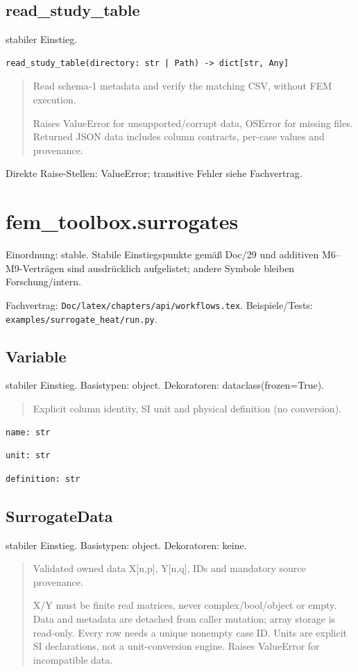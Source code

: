 \subsection{read\_study\_table}
stabiler Einstieg.
\begin{lstlisting}
read_study_table(directory: str | Path) -> dict[str, Any]
\end{lstlisting}
\begin{quote}
Read schema-1 metadata and verify the matching CSV, without FEM execution.\par Raises ValueError for unsupported/corrupt data, OSError for missing files. Returned JSON data includes column contracts, per-case values and provenance.
\end{quote}
Direkte Raise-Stellen: ValueError; transitive Fehler siehe Fachvertrag.
\section{fem\_toolbox.surrogates}
Einordnung: stable. Stabile Einstiegspunkte gemäß Doc/29 und additiven M6–M9-Verträgen sind ausdrücklich aufgelistet; andere Symbole bleiben Forschung/intern.
\par Fachvertrag: \nolinkurl{Doc/latex/chapters/api/workflows.tex}. Beispiele/Tests:
\nolinkurl{examples/surrogate_heat/run.py}.
\subsection{Variable}
stabiler Einstieg.
Basistypen: object. Dekoratoren: dataclass(frozen=True).
\begin{quote}
Explicit column identity, SI unit and physical definition (no conversion).
\end{quote}
\begin{lstlisting}
name: str
\end{lstlisting}
\begin{lstlisting}
unit: str
\end{lstlisting}
\begin{lstlisting}
definition: str
\end{lstlisting}
\subsection{SurrogateData}
stabiler Einstieg.
Basistypen: object. Dekoratoren: keine.
\begin{quote}
Validated owned data X[n,p], Y[n,q], IDs and mandatory source provenance.\par X/Y must be finite real matrices, never complex/bool/object or empty. Data and metadata are detached from caller mutation; array storage is read-only. Every row needs a unique nonempty case ID. Units are explicit SI declarations, not a unit-conversion engine. Raises ValueError for incompatible data.
\end{quote}
